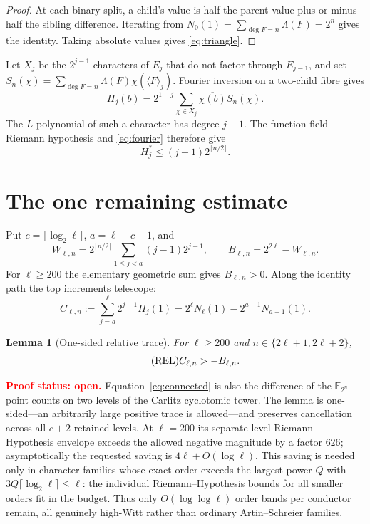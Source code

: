 \documentclass[10pt]{article}
\newtheorem{lemma}[theorem]{Lemma}
\newcommand{\F}{\mathbb F}
\newcommand{\REL}{\textup{REL}}
\begin{document}
\begin{proof}
At each binary split, a child's value is half the parent value plus or minus
half the sibling difference.  Iterating from
$N_0(1)=\sum_{\deg F=n}\Lambda(F)=2^n$ gives the identity.  Taking absolute
values gives \eqref{eq:triangle}.
\end{proof}

Let $X_j$ be the $2^{j-1}$ characters of $E_j$ that do not factor through
$E_{j-1}$, and set
$S_n(\chi)=\sum_{\deg F=n}\Lambda(F)\chi(\langle F\rangle_j)$.
Fourier inversion on a two-child fibre gives
\begin{equation}\label{eq:fourier}
 H_j(b)=2^{1-j}\sum_{\chi\in X_j}\overline{\chi(b)}S_n(\chi).
\end{equation}
The $L$-polynomial of such a character has degree $j-1$.  The function-field
Riemann hypothesis and \eqref{eq:fourier} therefore give
\begin{equation}\label{eq:weil}
 H_j^*\leq (j-1)2^{\lceil n/2\rceil}.
\end{equation}

\section{The one remaining estimate}

Put $c=\lceil\log_2\ell\rceil$, $a=\ell-c-1$, and
\[
 W_{\ell,n}=2^{\lceil n/2\rceil}
       \sum_{1\leq j<a}(j-1)2^{j-1},\qquad
 B_{\ell,n}=2^{2\ell}-W_{\ell,n}.
\]
For $\ell\geq200$ the elementary geometric sum gives $B_{\ell,n}>0$.
Along the identity path the top increments telescope:
\begin{equation}\label{eq:connected}
 C_{\ell,n}:=\sum_{j=a}^{\ell}2^{j-1}H_j(1)
 =2^\ell N_\ell(1)-2^{a-1}N_{a-1}(1).
\end{equation}

\begin{lemma}[One-sided relative trace]\label{lem:top}
For $\ell\geq200$ and $n\in\{2\ell+1,2\ell+2\}$,
\begin{equation}\tag{$\REL$}\label{eq:rel}
 C_{\ell,n}>-B_{\ell,n}.
\end{equation}
\end{lemma}

\noindent\textcolor{red}{\textbf{Proof status: open.}}
Equation~\eqref{eq:connected} is also the difference of the
$\F_{2^n}$-point counts on two levels of the Carlitz cyclotomic
tower.  The lemma is one-sided---an arbitrarily large positive trace is
allowed---and preserves cancellation across all $c+2$ retained levels.
At $\ell=200$ its separate-level Riemann--Hypothesis envelope exceeds the
allowed negative magnitude by a factor $626$; asymptotically the requested
saving is $4\ell+O(\log\ell)$.  This saving is needed only in character
families whose exact order exceeds the largest power $Q$ with
$3Q\lceil\log_2\ell\rceil\leq\ell$: the individual Riemann--Hypothesis bounds
for all smaller orders fit in the budget.  Thus only $O(\log\log\ell)$ order
bands per conductor remain, all genuinely high-Witt rather than ordinary
Artin--Schreier families.
\end{document}
